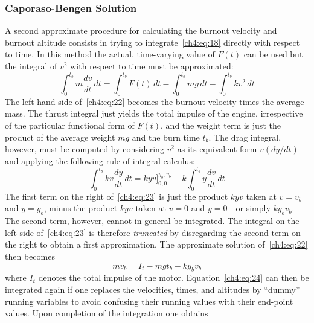 \subsubsection{Caporaso-Bengen Solution}\label{ch4:sec:2.1.2}

A second approximate procedure for calculating the burnout velocity and burnout altitude consists
in trying to integrate~\eqref{ch4:eq:18} directly with respect to time. In this method the actual,
time-varying value of $F(t)$ can be used but the integral of $v^{2}$ with respect to time must be
approximated:
\begin{equation}\label{ch4:eq:22}
\int_{0}^{t_b} m\frac{dv}{dt}\,dt = \int_{0}^{t_b} F(t)\,dt - \int_{0}^{t_b} mg\,dt
  - \int_{0}^{t_b} kv^{2}\,dt
\end{equation}
The left-hand side of~\eqref{ch4:eq:22} becomes the burnout velocity times the average mass. The
thrust integral just yields the total impulse of the engine, irrespective of the particular
functional form of $F(t)$, and the weight term is just the product of the average weight $mg$ and
the burn time $t_b$. The drag integral, however, must be computed by considering $v^{2}$ as its
equivalent form $v(dy/dt)$ and applying the following rule of integral calculus:
\begin{equation}\label{ch4:eq:23}
\int_{0}^{t_b} kv\frac{dy}{dt}\,dt = kyv\Big]_{0,0}^{y_b,v_b} - k\int_{0}^{t_b} y\frac{dv}{dt}\,dt
\end{equation}
The first term on the right of~\eqref{ch4:eq:23} is just the product $kyv$ taken at $v = v_b$ and
$y = y_b$, minus the product $kyv$ taken at $v = 0$ and $y = 0$---or simply $ky_bv_b$. The second
term, however, cannot in general be integrated. The integral on the left side of~\eqref{ch4:eq:23}
is therefore \emph{truncated} by disregarding the second term on the right to obtain a first
approximation. The approximate solution of~\eqref{ch4:eq:22} then becomes
\begin{equation}\label{ch4:eq:24}
mv_b = I_t - mgt_b - ky_bv_b
\end{equation}
where $I_t$ denotes the total impulse of the motor. Equation~\eqref{ch4:eq:24} can then be
integrated again if one replaces the velocities, times, and altitudes by ``dummy'' running
variables to avoid confusing their running values with their end-point values. Upon completion of
the integration one obtains
